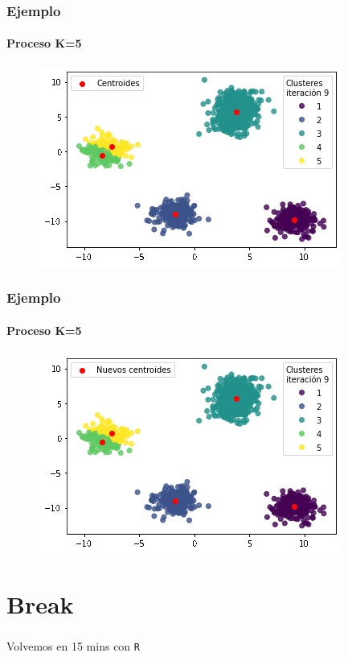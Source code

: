 \documentclass[
  shownotes,
  xcolor={svgnames},
  hyperref={colorlinks,citecolor=DarkBlue,linkcolor=DarkRed,urlcolor=DarkBlue}
  , aspectratio=169]{beamer}
\begin{document}
\begin{frame}
\frametitle{Ejemplo}
\framesubtitle{Proceso K=5}


\begin{figure}[H] \centering

    \centering
    \includegraphics[scale=.7]{figures/k5_15.jpg}
  \\
  \tiny
\end{figure}


\end{frame}
\begin{frame}
\frametitle{Ejemplo}
\framesubtitle{Proceso K=5}


\begin{figure}[H] \centering

    \centering
    \includegraphics[scale=.7]{figures/k5_16.jpg}
  \\
  \tiny
\end{figure}


\end{frame}

\section{Break}
\begin{frame}
\frametitle{}

\begin{centering}
\huge
\textcolor{andesred}{Volvemos en 15 mins con \texttt{R} }

\end{centering}

\end{frame}
\end{document}
